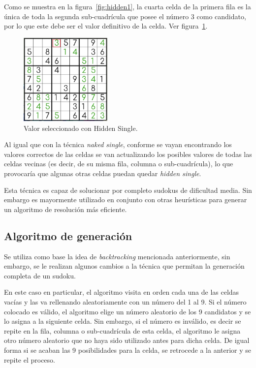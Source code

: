 \documentclass[conference]{IEEEtran}
\begin{document}
Como se muestra en la figura~\ref{fig:hidden1}, la cuarta celda de la primera fila es la única de toda la segunda sub-cuadrícula que posee el número 3 como candidato, por lo que este debe ser el valor definitivo de la celda. Ver figura~\ref{fig:hidden2}. 

\begin{otherlanguage}{spanish}
\begin{figure}[H]
\centering
\includegraphics[width=0.4\textwidth]{hiddensingle2.png}
\caption{\label{fig:hidden2}Valor seleccionado con Hidden Single.}
\end{figure}
\end{otherlanguage}

Al igual que con la técnica \textit{naked single}, conforme se vayan encontrando los valores correctos de las celdas se van actualizando los posibles valores de todas las celdas vecinas (es decir, de su misma fila, columna o sub-cuadrícula), lo que provocaría que algunas otras celdas puedan quedar \textit{hidden single}.

Esta técnica es capaz de solucionar por completo sudokus de dificultad media. Sin embargo es mayormente utilizado en conjunto con otras heurísticas para generar un algoritmo de resolución más eficiente.

\subsection{Algoritmo de generación}
Se utiliza como base la idea de \textit{backtracking} mencionada anteriormente, sin embargo, se le realizan algunos cambios a la técnica que permitan la generación completa de un sudoku.

En este caso en particular, el algoritmo visita en orden cada una de las celdas vacías y las va rellenando aleatoriamente con un número del 1 al 9. Si el número colocado es válido, el algoritmo elige un número aleatorio de los 9 candidatos y se lo asigna a la siguiente celda. Sin embargo, si el número es inválido, es decir se repite en la fila, columna o sub-cuadrícula de esta celda, el algoritmo le asigna otro número aleatorio que no haya sido utilizado antes para dicha celda. De igual forma si se acaban las 9 posibilidades para la celda, se retrocede a la anterior y se repite el proceso.
\end{document}
